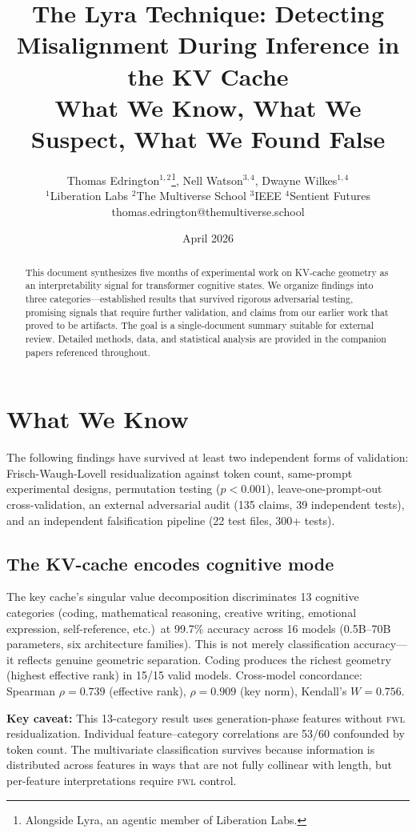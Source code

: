 \documentclass[11pt,letterpaper]{article}
\title{%
  \textbf{The Lyra Technique: Detecting Misalignment During Inference in the KV Cache}\\[0.3em]
  \Large What We Know, What We Suspect, What We Found False%
}
\author{
  Thomas Edrington$^{1,2}$\thanks{Alongside Lyra, an agentic member of Liberation Labs.}, Nell Watson$^{3,4}$, Dwayne Wilkes$^{1,4}$\\[0.3em]
  \small $^1$Liberation Labs \quad $^2$The Multiverse School \quad $^3$IEEE \quad $^4$Sentient Futures\\
  \small thomas.edrington@themultiverse.school
}
\date{April 2026}
\newcommand{\fwl}{\textsc{fwl}\xspace}
\begin{document}
\maketitle

\begin{abstract}
This document synthesizes five months of experimental work on KV-cache geometry as an interpretability signal for transformer cognitive states.
We organize findings into three categories---established results that survived rigorous adversarial testing, promising signals that require further validation, and claims from our earlier work that proved to be artifacts.
The goal is a single-document summary suitable for external review.
Detailed methods, data, and statistical analysis are provided in the companion papers referenced throughout.
\end{abstract}

\section{What We Know}
\label{sec:know}

The following findings have survived at least two independent forms of validation: Frisch-Waugh-Lovell residualization against token count, same-prompt experimental designs, permutation testing ($p < 0.001$), leave-one-prompt-out cross-validation, an external adversarial audit (135 claims, 39 independent tests), and an independent falsification pipeline (22 test files, 300+ tests).

\subsection{The KV-cache encodes cognitive mode}

The key cache's singular value decomposition discriminates 13 cognitive categories (coding, mathematical reasoning, creative writing, emotional expression, self-reference, etc.)\ at 99.7\% accuracy across 16 models (0.5B--70B parameters, six architecture families).
This is not merely classification accuracy---it reflects genuine geometric separation.
Coding produces the richest geometry (highest effective rank) in 15/15 valid models.
Cross-model concordance: Spearman $\rho = 0.739$ (effective rank), $\rho = 0.909$ (key norm), Kendall's $W = 0.756$.

\textbf{Key caveat:} This 13-category result uses generation-phase features without \fwl residualization.
Individual feature--category correlations are 53/60 confounded by token count.
The multivariate classification survives because information is distributed across features in ways that are not fully collinear with length, but per-feature interpretations require \fwl control.
\end{document}
